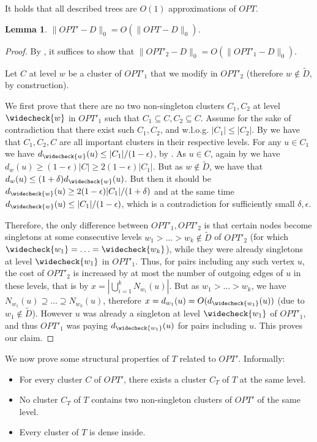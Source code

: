 \documentclass{article}
\newtheorem{lemma}[theorem]{Lemma}
\begin{document}
It holds that all described trees are $O(1)$ approximations of $OPT$.

\begin{lemma} \label{lem:costOPTp}
$\|OPT'-D\|_0 = O(\|OPT-D\|_0)$.
\end{lemma}
\begin{proof}
By , it suffices to show that $\|OPT'_2-D\|_0 = O(\|OPT'_1-D\|_0)$.

Let $C$ at level $w$ be a cluster of $OPT'_1$ that we modify in $OPT'_2$ (therefore $w\not \in \widetilde{D}$, by construction).

We first prove that there are no two non-singleton clusters $C_1,C_2$ at level $\widecheck{w}$ in $OPT'_1$ such that $C_1\subseteq C, C_2\subseteq C$.
Assume for the sake of contradiction that there exist such $C_1,C_2$, and w.l.o.g. $|C_1| \le |C_2|$.
By  we have that $C_1,C_2,C$ are all important clusters in their respective levels.
For any $u\in C_1$ we have $d_{\widecheck{w}}(u) \le |C_1| / (1-\epsilon)$, by .
As $u\in C$, again by  we have $d_{w}(u) \ge (1-\epsilon)|C| \ge 2(1-\epsilon)|C_1|$.
But as $w\not \in \widetilde{D}$, we have that $d_w(u) \le (1+\delta)d_{\widecheck{w}}(u)$.
But then it should be $d_{\widecheck{w}}(u) \ge 2(1-\epsilon)|C_1|/(1+\delta)$ and at the same time $d_{\widecheck{w}}(u) \le |C_1| / (1-\epsilon)$, which is a contradiction for sufficiently small $\delta,\epsilon$.

Therefore, the only difference between $OPT'_1, OPT'_2$ is that certain nodes become singletons at some consecutive levels $w_1 > \ldots > w_k \not \in \widetilde{D}$ of $OPT'_2$ (for which $\widecheck{w_1} = \ldots = \widecheck{w_k}$), while they were already singletons at level $\widecheck{w_1}$ in $OPT'_1$.
Thus, for pairs including any such vertex $u$, the cost of $OPT'_2$ is increased by at most the number of outgoing edges of $u$ in these levels, that is by $x=|\bigcup_{i=1}^{k} N_{w_i}(u)|$.
But as $w_1 > \ldots > w_k$, we have $N_{w_1}(u) \supseteq \ldots \supseteq N_{w_k}(u)$, therefore $x=d_{w_1}(u) = O(d_{\widecheck{w_1}}(u))$ (due to $w_1\not \in \widetilde{D}$). 
However $u$ was already a singleton at level $\widecheck{w_1}$ of $OPT'_1$, and thus $OPT'_1$ was paying 
$d_{\widecheck{w_1}}(u)$ for pairs including $u$.
This proves our claim.
\end{proof}

We now prove some structural properties of $T$ related to $OPT'$.
Informally:
\begin{itemize}
    \item For every cluster $C$ of $OPT'$, there exists a cluster $C_T$ of $T$ at the same level.
    \item No cluster $C_T$ of $T$ contains two non-singleton clusters of $OPT'$ of the same level.
    \item Every cluster of $T$ is dense inside.
\end{itemize}
\end{document}
